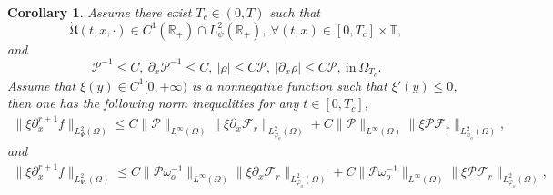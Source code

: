 \documentclass{amsart}
\numberwithin{equation}{section}
\newtheorem{corollary}{Corollary}[section]
\begin{document}
\begin{corollary}\label{ncC3}
Assume there exist $T_{c}\in(0,T)$ such that
$$\dot{\mathfrak{U}}(t,x,\cdot)\in C^{1}(\mathbb{R}_{+})\cap L_{\psi}^{2}(\mathbb{R}_{+}),~\forall (t,x)\in[0,T_{c}]\times\mathbb{T},$$
and
$$\mathcal{P}^{-1}\leq C,~\partial_{x}\mathcal{P}^{-1}\leq C,~|\rho|\leq C\mathcal{P},~|\partial_{x}\rho|\leq C\mathcal{P},~\text{in}~ \Omega_{T_{c}}.$$
Assume that $\xi(y)\in C^{1}[0,+\infty)$ is a nonnegative function such that $\xi'(y)\leq0$, then one has the following norm inequalities for any $t\in[0,T_{c}]$,
\begin{align}\label{ncc3}
\|\xi\partial_{x}^{r+1}f\|_{L_{\Psi}^{2}(\Omega)}
\leq C\|\mathcal{P}\|_{L^{\infty}(\Omega)}\|\xi\partial_{x}\mathcal{F}_{r}\|_{L_{\varphi_{o}}^{2}(\Omega)}
    +C\|\mathcal{P}\|_{L^{\infty}(\Omega)}\|\xi\mathcal{P}\mathcal{F}_{r}\|_{L_{\varphi_{o}}^{2}(\Omega)},
\end{align}
and
\begin{align}\label{ncc3'}
\|\xi\partial_{x}^{r+1}f\|_{L_{\Psi_{c}}^{2}(\Omega)}
\leq C\|\mathcal{P}\omega_{o}^{-1}\|_{L^{\infty}(\Omega)}\|\xi\partial_{x}\mathcal{F}_{r}\|_{L_{\varphi_{o}}^{2}(\Omega)}
    +C\|\mathcal{P}\omega_{o}^{-1}\|_{L^{\infty}(\Omega)}\|\xi\mathcal{P}\mathcal{F}_{r}\|_{L_{\varphi_{o}}^{2}(\Omega)},
\end{align}

\end{corollary}
\end{document}
